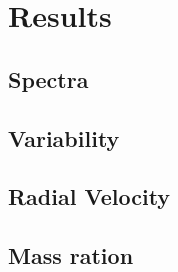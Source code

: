 \chapter{Results}\label{chap:results}
\thispagestyle{fancy}

\section{Spectra}

\section{Variability}

\section{Radial Velocity}

\section{Mass ration}
